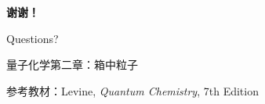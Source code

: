 \documentclass[aspectratio=169,11pt]{beamer}
\begin{document}
\begin{frame}[plain]
  \begin{center}
    \vspace*{2cm}
    {\Huge\color{iqbblue}\textbf{谢谢！}}

    \vspace{1cm}

    {\Large Questions?}

    \vspace{2cm}

    {\large 量子化学第二章：箱中粒子}

    \vspace{0.5cm}

    {\normalsize 参考教材：Levine, \textit{Quantum Chemistry}, 7th Edition}
  \end{center}
\end{frame}
\end{document}
